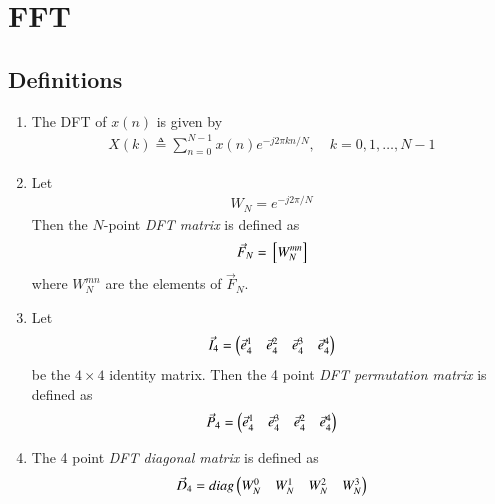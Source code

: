 \documentclass[journal,12pt,twocolumn]{IEEEtran}
\renewcommand\thesection{\arabic{section}}
\begin{document}
\section{FFT}
\subsection{Definitions}
\begin{enumerate}[label=\arabic*.,ref=\thesection.\theenumi]
	\item The DFT of $x(n)$ is given by
	\begin{align}
		X(k) \triangleq \sum_{n=0}^{N-1} x(n) e^{-j 2 \pi k n / N}, \quad k=0,1, \ldots, N-1
	\end{align}
	\item Let 
	\begin{align}
		W_{N} = e^{-j2\pi/N} 
	\end{align}
	Then the $N$-point {\em DFT matrix} is defined as 
	\begin{align}
		\vec{F}_{N} = {}\left[W_{N}^{mn}\right]
	\end{align}
	where $W_{N}^{mn}$ are the elements of $\vec{F}_{N}$.
	\item Let 
	\begin{align}
		\vec{I}_4 = \begin{pmatrix}\vec{e}_4^{1} &\vec{e}_4^{2} &\vec{e}_4^{3} &\vec{e}_4^{4} \end{pmatrix}
	\end{align}
	be the $4\times 4$ identity matrix.  Then the 4 point {\em DFT permutation matrix} is defined as 
	\begin{align}
		\vec{P}_4 = \begin{pmatrix}\vec{e}_4^{1} &\vec{e}_4^{3} &\vec{e}_4^{2} &\vec{e}_4^{4}\end{pmatrix}
	\end{align}
	\item The 4 point {\em DFT diagonal matrix} is defined as 
	\begin{align}
		\vec{D}_4 = diag\begin{pmatrix}W_{N}^{0} & W_{N}^{1} & W_{N}^{2} & W_{N}^{3}\end{pmatrix}
	\end{align}
\end{enumerate}
\end{document}
